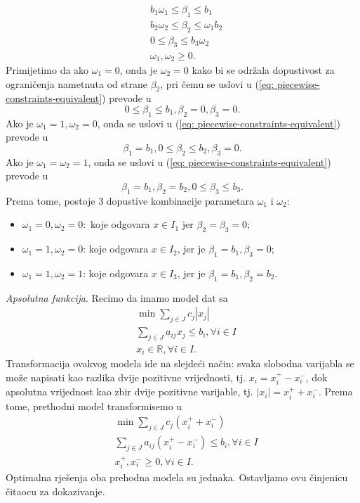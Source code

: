 \documentclass[a4paper, utf8, 11pt, colorlinks]{book}
\begin{document}
\begin{align}
     & b_1 \omega_1 \leq \beta_1 \leq b_1   \nonumber \\
     & b_2 \omega_2 \leq \beta_2 \leq \omega_1 b_2 \nonumber \\
     & 0 \leq \beta_3 \leq b_3 \omega_2 \nonumber \\
     & \omega_1, \omega_2 \geq 0. \label{eq: piecewise-constraints-equivalent}
\end{align}
      Primijetimo da ako $\omega_1 = 0$, onda je $\omega_2= 0$ kako bi se održala dopustivost za ograničenja nametnuta  od strane $\beta_2$, pri čemu se uslovi u (\ref{eq: piecewise-constraints-equivalent}) prevode u
      $$ 0 \leq \beta_1 \leq b_1, \beta_2 =0, \beta_3 =0.$$
      Ako je $\omega_1 = 1, \omega_2 = 0$, onda se uslovi u (\ref{eq: piecewise-constraints-equivalent}) prevode u
            $$   \beta_1 = b_1, 0 \leq \beta_2 \leq b_2, \beta_3 =0.$$
    Ako je $\omega_1 = \omega_2 = 1$, onda se  uslovi u (\ref{eq: piecewise-constraints-equivalent}) prevode u
    $$ \beta_1 = b_1, \beta_2 = b_2, 0 \leq \beta_3 \leq b_3.$$
    Prema tome, postoje 3 dopustive kombinacije parametara $\omega_1$ i $\omega_2$:
    \begin{itemize}
             \item  $\omega_1 = 0, \omega_2= 0:$ koje odgovara $x \in I_1$ jer $\beta_2=\beta_3=0$;  
             \item $\omega_1 = 1, \omega_2 = 0$: koje odgovara $x\in I_2$, jer je $\beta_1=b_1, \beta_3=0$;
              \item $\omega_1 = 1, \omega_2 = 1$: koje odgovara $x\in I_3$, jer je $\beta_1=b_1, \beta_2=b_2$.
    \end{itemize}
 
\emph{Apsolutna funkcija}.   Recimo da imamo model dat sa 
\begin{align*}
	  &\min \sum_{j \in J} c_j |x_j| \\
	  & \sum_{j\in J} a_{ij} x_j \leq b_i, \forall i\in I \\
	  & x_i \in \mathbb{R}, \forall i \in I.
\end{align*}  
Transformacija ovakvog modela ide na slejdeći način: 
svaka slobodna varijabla se može napisati kao razlika dvije pozitivne vrijednosti, tj.  $x_i = x_i^+ - x_i^-$, dok apsolutna vrijednost kao zbir dvije pozitivne varijable, tj. $|x_i|= x_i^+ + x_i^-$. Prema tome, prethodni model transformisemo u 
\begin{align*}
     &\min \sum_{j \in J} c_j  (x_i^+ + x_i^-) \\
     &\sum_{j\in J} a_{ij} (  x_i^+ - x_i^- ) \leq b_i, \forall i\in I \\
     &  x_i^+, x_i^- \geq 0, \forall i \in I.
\end{align*}
  Optimalna rješenja oba prehodna modela su jednaka. Ostavljamo ovu činjenicu čitaocu za dokazivanje.
 
\end{document}

